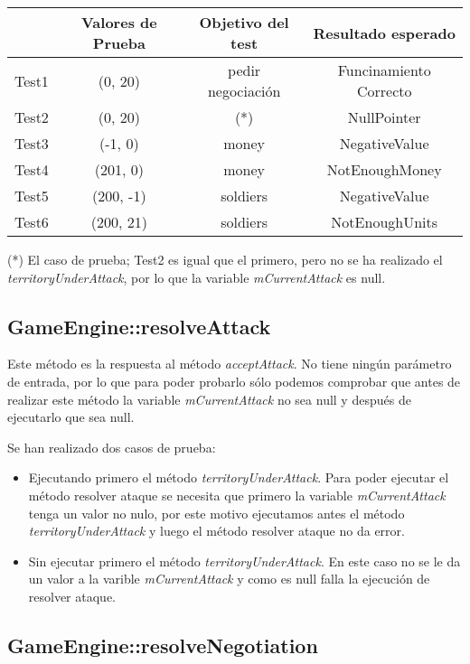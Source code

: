 {\footnotesize
\begin{longtable}[c]{lccc}
 & \textbf{Valores de Prueba} & \textbf{Objetivo del test} & \textbf{Resultado esperado} \\
\hline \hline
\endhead

Test1 & (0, 20) & pedir negociación & Funcinamiento Correcto\\
Test2 & (0, 20) & (*) & NullPointer\\
Test3 & (-1, 0) & money & NegativeValue\\
Test4 & (201, 0) & money & NotEnoughMoney\\
Test5 & (200, -1) & soldiers & NegativeValue\\
Test6 & (200, 21) & soldiers & NotEnoughUnits\\

\hline
\end{longtable}
}

(*) El caso de prueba; Test2 es igual que el primero, pero no se ha realizado el \textit{territoryUnderAttack}, por lo que la variable \textit{mCurrentAttack} es null.

\subsection{GameEngine::resolveAttack}

Este método es la respuesta al método \textit{acceptAttack}. No tiene ningún parámetro de entrada, por lo que para poder probarlo sólo podemos comprobar que antes de realizar este método la variable \textit{mCurrentAttack} no sea null y después de ejecutarlo que sea null.

Se han realizado dos casos de prueba:
\begin{itemize}
\item Ejecutando primero el método \textit{territoryUnderAttack}. Para poder ejecutar el método resolver ataque se necesita que primero la variable \textit{mCurrentAttack} tenga un valor no nulo, por este motivo ejecutamos antes el método \textit{territoryUnderAttack} y luego el método resolver ataque no da error.
\item Sin ejecutar primero el método \textit{territoryUnderAttack}. En este caso no se le da un valor a la varible \textit{mCurrentAttack} y como es null falla la ejecución de resolver ataque.
\end{itemize}

\subsection{GameEngine::resolveNegotiation}

